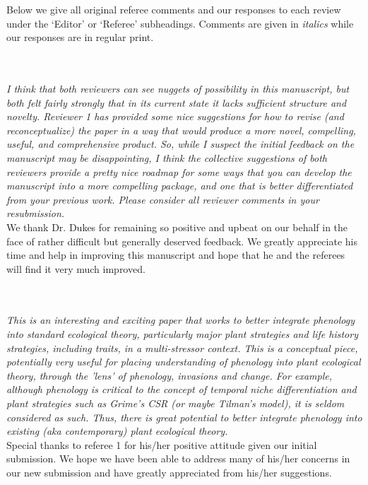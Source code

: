 \documentclass[11pt,a4paper]{letter}
\begin{document}
\begin{letter}{}
\newpage
Below we give all original referee comments and our responses to each
review under the `Editor' or `Referee' subheadings. Comments are given in \emph{italics} while
our responses are in regular print. 

\\
\\
\emph{I think that both reviewers can see nuggets of possibility in this manuscript, but both felt fairly strongly that in its current state it lacks sufficient structure and novelty. Reviewer 1 has provided some nice suggestions for how to revise (and reconceptualize) the paper in a way that would produce a more novel, compelling, useful, and comprehensive product. So, while I suspect the initial feedback on the manuscript may be disappointing, I think the collective suggestions of both reviewers provide a pretty nice roadmap for some ways that you can develop the manuscript into a more compelling package, and one that is better differentiated from your previous work. Please consider all reviewer comments in your resubmission. }\\ 

We thank Dr. Dukes for remaining so positive and upbeat on our behalf in the face of rather difficult but generally deserved feedback. We greatly appreciate his time and help in improving this manuscript and hope that he and the referees will find it very much improved.

\\
\\
\emph{This is an interesting and exciting paper that works to better integrate phenology into standard ecological theory, particularly major plant strategies and life history strategies, including traits, in a multi-stressor context. This is a conceptual piece, potentially very useful for placing understanding of phenology into plant ecological theory, through the 'lens' of phenology, invasions and change. For example, although phenology is critical to the concept of temporal niche differentiation and plant strategies such as Grime's CSR (or maybe Tilman's model), it is seldom considered as such. Thus, there is great potential to better integrate phenology into existing (aka contemporary) plant ecological theory.}\\

Special thanks to referee 1 for his/her positive attitude given our initial submission. We hope we have been able to address many of his/her concerns in our new submission and have greatly appreciated from his/her suggestions. \\ 


\end{letter}
\end{document}
